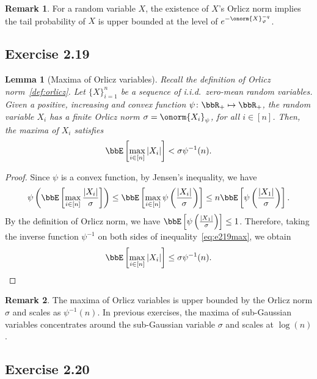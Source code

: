 \documentclass[11pt]{article}
\newcommand{\of}[1]{\left(#1\right)}
\newcommand{\off}[1]{\left[#1\right]}
\theoremstyle{plain}
\newtheorem{lem}{Lemma}
\theoremstyle{definition}
\newtheorem{rmk}{Remark}
\begin{document}
    \begin{rmk}
    	For a random variable $X$, the existence of $X$'s Orlicz norm implies the tail probability of $X$ is upper bounded at the level of $e^{-\onorm{X}^{-q}_{\varphi} }$. 
    \end{rmk}
    
\subsection{Exercise 2.19}
\begin{lem}[Maxima of Orlicz variables] Recall the definition of Orlicz norm~\ref{def:orlicz}. Let $\{X\}_{i=1}^n$ be a sequence of i.i.d.\ zero-mean random variables. Given a positive, increasing and convex function $\psi \colon \bbR_+ \mapsto \bbR_+$, the random variable $X_i$ has a finite Orlicz norm $\sigma = \onorm{X_i}_{\psi}$, for all $i \in [n]$. Then, the maxima of $X_i$ satisfies
\begin{equation}
	\bbE \off{ \max_{i\in[n]} |X_i| } < \sigma \psi^{-1}(n).
\end{equation}
	
\end{lem}

\begin{proof}
	Since $\psi$ is a convex function, by Jensen's inequality, we have
	\begin{equation}\label{eq:e219max}
		\psi \of{\bbE \off{\max_{i \in [n]} \frac{|X_i|}{\sigma}  } } \leq \bbE \off{ \max_{i\in[n]} \psi \of{\frac{|X_i|}{\sigma}}   } \leq n \bbE \off{ \psi \of{\frac{|X_1|}{\sigma}} }.
	\end{equation}
	By the definition of Orlicz norm, we have $\bbE \off{ \psi \of{\frac{|X_1|}{\sigma}} } \leq 1$. Therefore, taking the inverse function $\psi^{-1}$ on both sides of inequality~\eqref{eq:e219max}, we obtain
	\[  \bbE \off{\max_{i \in [n]} {|X_i|} } \leq \sigma \psi^{-1}(n).  \]
\end{proof}

\begin{rmk}
	The maxima of Orlicz variables is upper bounded by the Orlicz norm $\sigma$ and scales as $\psi^{-1}(n)$. In previous exercises, the maxima of sub-Gaussian variables concentrates around the sub-Gaussian variable $\sigma$ and scales at $\log (n)$. 
\end{rmk}
    
\subsection{Exercise 2.20}
\end{document}
